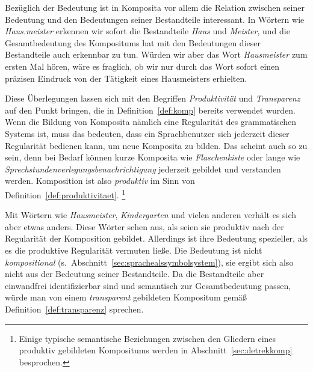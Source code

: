 Bezüglich der Bedeutung ist in Komposita vor allem die Relation zwischen seiner Bedeutung und den Bedeutungen seiner Bestandteile interessant.
In Wörtern wie \textit{Haus.meister} erkennen wir sofort die Bestandteile \textit{Haus} und \textit{Meister}, und die Gesamtbedeutung des Kompositums hat mit den Bedeutungen dieser Bestandteile auch erkennbar zu tun.
Würden wir aber das Wort \textit{Hausmeister} zum ersten Mal hören, wäre es fraglich, ob wir nur durch das Wort sofort einen präzisen Eindruck von der Tätigkeit eines Hausmeisters erhielten.

Diese Überlegungen lassen sich mit den Begriffen \textit{Produktivität} und \textit{Transparenz} auf den Punkt bringen, die in Definition~\ref{def:komp} bereits verwendet wurden.
Wenn die Bildung von Komposita nämlich eine Regularität des grammatischen Systems ist, muss das bedeuten, dass ein Sprachbenutzer sich jederzeit dieser Regularität bedienen kann, um neue Komposita zu bilden.
Das scheint auch so zu sein, denn bei Bedarf können kurze Komposita wie \textit{Flaschenkiste} oder lange wie \textit{Sprechstundenverlegungsbenachrichtigung} jederzeit gebildet und verstanden werden.
Komposition ist also \textit{produktiv} im Sinn von Definition~\ref{def:produktivitaet}.%
\footnote{Einige typische semantische Beziehungen zwischen den Gliedern eines produktiv gebildeten Kompositums werden in Abschnitt~\ref{sec:detrekkomp} besprochen.}


Mit Wörtern wie \textit{Hausmeister}, \textit{Kindergarten} und vielen anderen verhält es sich aber etwas anders.
Diese Wörter sehen aus, als seien sie produktiv nach der Regularität der Komposition gebildet.
Allerdings ist ihre Bedeutung spezieller, als es die produktive Regularität vermuten ließe.
Die Bedeutung ist nicht \textit{kompositional} (s.\ Abschnitt~\ref{sec:sprachealssymbolsystem}), sie ergibt sich also nicht aus der Bedeutung seiner Bestandteile.
Da die Bestandteile aber einwandfrei identifizierbar sind und semantisch zur Gesamtbedeutung passen, würde man von einem \textit{transparent} gebildeten Kompositum gemäß Definition~\ref{def:transparenz} sprechen.



